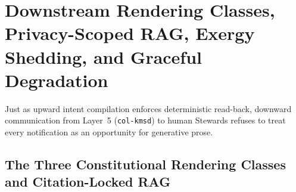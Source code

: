 \section{Downstream Rendering Classes, Privacy-Scoped RAG, Exergy Shedding, and Graceful Degradation}
\label{sec:rendering-rag-exergy}

Just as upward intent compilation enforces deterministic read-back, downward communication from Layer~5 (\texttt{col-kmsd}) to human Stewards refuses to treat every notification as an opportunity for generative prose.

\subsection{The Three Constitutional Rendering Classes and Citation-Locked RAG}
\label{subsec:rendering-classes-rag}


